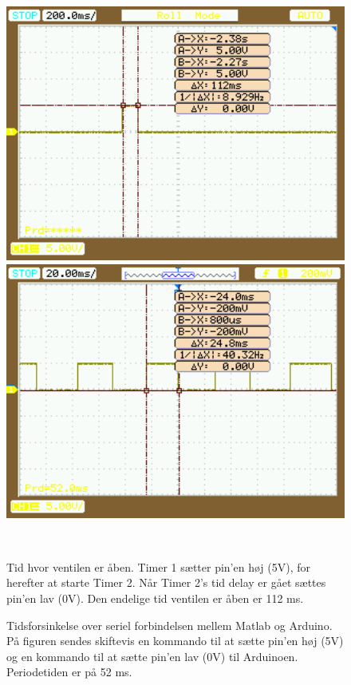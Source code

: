  \begin{figure}[H] \centering
\begin{minipage}[b]{0.48\textwidth} \centering
\includegraphics[width=1.00\textwidth]{billeder/timerdelay.png} %
\end{minipage} \hfill
\begin{minipage}[b]{0.48\textwidth} \centering
\includegraphics[width=1.00\textwidth]{billeder/serialconn.png} %
\end{minipage} \\ %
\begin{minipage}[t]{0.48\textwidth}
\caption{Tid hvor ventilen er åben. Timer 1 sætter pin'en høj (5V), for herefter at starte Timer 2. Når Timer 2's tid delay er gået sættes pin'en lav (0V). Den endelige tid ventilen er åben er 112 ms.} %
\label{fig:timerdelay}
\end{minipage} \hfill
\begin{minipage}[t]{0.48\textwidth}
\caption{Tidsforsinkelse over seriel forbindelsen mellem Matlab og Arduino. På figuren sendes skiftevis en kommando til at sætte pin'en høj (5V) og en kommando til at sætte pin'en lav (0V) til Arduinoen. Periodetiden er på 52 ms.} %
\label{fig:serielconn}
\end{minipage}
\end{figure}


